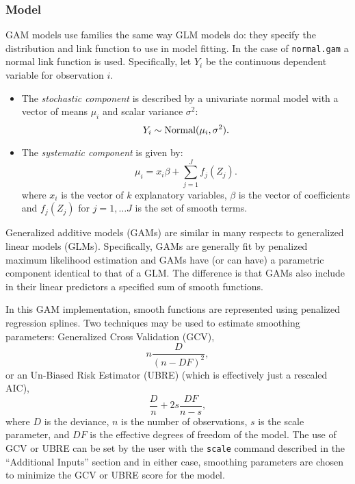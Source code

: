 \subsubsection{Model}


GAM models use families the same way GLM models do: they specify the distribution and link function to use in model fitting. In the case of {\tt normal.gam} a normal link function is used. Specifically, let $Y_{i}$ be the continuous dependent variable for observation $i$.  
\begin{itemize}
\item The \emph{stochastic component} is described by a univariate normal model with a vector of means $\mu_i$ and scalar variance $\sigma^2$: 
\begin{equation*}
Y_{i}  \sim \text{Normal} ( \mu_{i}, \sigma^2).\\
\end{equation*}
\item The \emph{systematic component} is given by:
\begin{equation*}
\mu_i = x_i\beta + \sum_{j=1}^{J} f_j (Z_j).
\end{equation*}
where $ x_i$ is the vector of $k$ explanatory variables, $\beta$ is the vector of coefficients and $f_j(Z_j)$ for $j=1, \ldots J$ is the set of smooth terms.
\end{itemize}


Generalized additive models (GAMs) are similar in many respects to generalized linear models (GLMs). Specifically, GAMs are generally fit by penalized maximum likelihood estimation and GAMs have (or can have) a parametric component identical to that of a GLM. The difference is that GAMs also include in their linear predictors a specified sum of smooth functions. 

In this GAM implementation, smooth functions are represented using penalized regression splines. Two techniques may be used to estimate smoothing parameters: Generalized Cross Validation (GCV),
\begin{equation}
n \frac{D}{(n-DF)^2},
\end{equation}
or an Un-Biased Risk Estimator (UBRE) (which is effectively just a rescaled AIC),
\begin{equation}
\frac{D}{n} + 2 s \frac{DF}{n-s},
\end{equation}
where $D$ is the deviance, $n$ is the number of observations, $s$ is the scale parameter, and $DF$ is the effective degrees of freedom of the model. The use of GCV or UBRE can be set by the user with the {\tt scale} command described in the ``Additional Inputs'' section and in either case, smoothing parameters are chosen to minimize the GCV or UBRE score for the model. 

